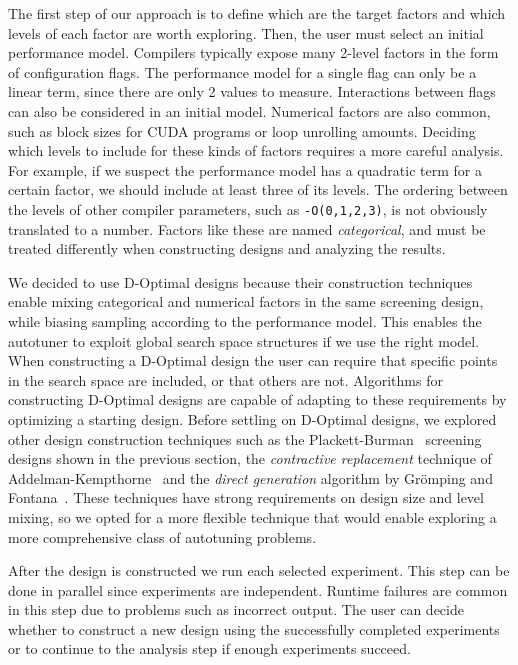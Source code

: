 \documentclass[conference]{IEEEtran}
\begin{document}
The first step of our approach is to define which are the target factors and
which levels of each factor are worth exploring. Then, the user must select an
initial performance model. Compilers typically expose many 2-level factors in
the form of configuration flags. The performance model for a single flag can
only be a linear term, since there are only 2 values to measure. Interactions
between flags can also be considered in an initial model. Numerical factors are
also common, such as block sizes for CUDA programs or loop unrolling amounts.
Deciding which levels to include for these kinds of factors requires a more
careful analysis. For example, if we suspect the performance model has a
quadratic term for a certain factor, we should include at least three of its
levels. The ordering between the levels of other compiler parameters, such as
\texttt{-O(0,1,2,3)}, is not obviously translated to a number. Factors like
these are named \emph{categorical}, and must be treated differently when constructing
designs and analyzing the results.

We decided to use D-Optimal designs because their construction techniques enable
mixing categorical and numerical factors in the same screening design, while
biasing sampling according to the performance model. This enables the autotuner to
exploit global search space structures if we use the right model. When
constructing a D-Optimal design the user can require that specific points in the
search space are included, or that others are not. Algorithms for constructing
D-Optimal designs are capable of adapting to these requirements by optimizing a
starting design. Before settling on D-Optimal designs, we explored other design
construction techniques such as the
Plackett-Burman~\cite{plackett1946design} screening designs shown in the
previous section, the \emph{contractive replacement} technique of
Addelman-Kempthorne~\cite{addelman1961some} and the \emph{direct generation}
algorithm by Grömping and Fontana~\cite{ulrike2018algorithm}. These
techniques have strong requirements on design size and level mixing, so we opted
for a more flexible technique that would enable exploring a more comprehensive
class of autotuning problems.

After the design is constructed we run each selected experiment. This step can
be done in parallel since experiments are independent. Runtime failures are
common in this step due to problems such as incorrect output. The user can
decide whether to construct a new design using the successfully completed
experiments or to continue to the analysis step if enough experiments succeed.
\end{document}
